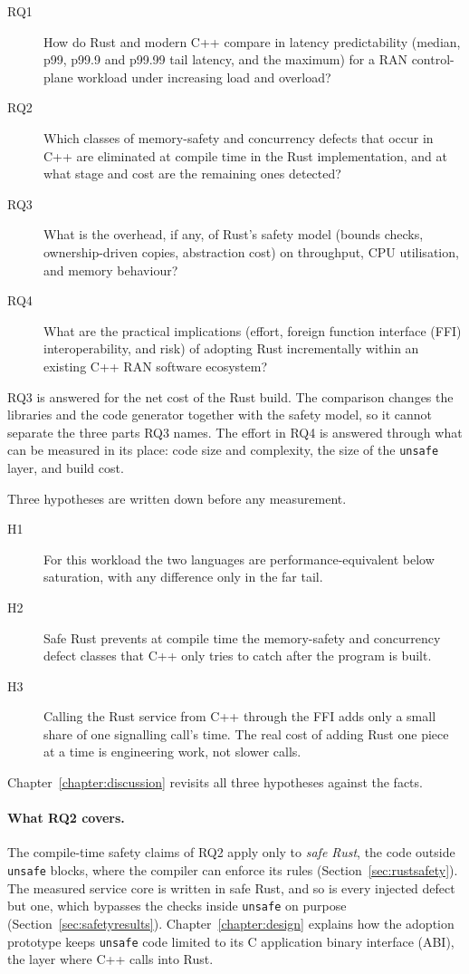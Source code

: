 \documentclass[english,oneside,a4paper,censored,csm,software-track-2020]{HYthesisML}
\begin{document}
\begin{description}
  \item[RQ1] How do Rust and modern C++ compare in latency predictability (median, p99,
        p99.9 and p99.99 tail latency, and the maximum) for a RAN control-plane workload
        under increasing load and overload?
  \item[RQ2] Which classes of memory-safety and concurrency defects that occur in C++ are
        eliminated at compile time in the Rust implementation, and at what stage and cost
        are the remaining ones detected?
  \item[RQ3] What is the overhead, if any, of Rust's safety model (bounds checks,
        ownership-driven copies, abstraction cost) on throughput, CPU utilisation, and
        memory behaviour?
  \item[RQ4] What are the practical implications (effort, foreign function interface (FFI)
        interoperability, and risk) of adopting Rust incrementally within an existing C++ RAN
        software ecosystem?
\end{description}
RQ3 is answered for the net cost of the Rust build. The comparison changes the libraries
and the code generator together with the safety model, so it
cannot separate the three parts RQ3 names. The effort in RQ4 is answered through what can be
measured in its place: code size and complexity, the size of the \texttt{unsafe} layer, and
build cost.

Three hypotheses are written down before any measurement.
\begin{description}
  \item[H1] For this workload the two languages are performance-equivalent below
        saturation, with any difference only in the far tail.
  \item[H2] Safe Rust prevents at compile time the memory-safety and concurrency defect
        classes that C++ only tries to catch after the program is built.
  \item[H3] Calling the Rust service from C++ through the FFI adds only a small
        share of one signalling call's time. The real cost of adding Rust one
        piece at a time is engineering work, not slower calls.
\end{description}
Chapter~\ref{chapter:discussion} revisits all three hypotheses against the facts.

\paragraph{What RQ2 covers.}
The compile-time safety claims of RQ2 apply only to \emph{safe Rust}, the code outside
\texttt{unsafe} blocks, where the compiler can enforce its rules
(Section~\ref{sec:rustsafety}). The measured service core is written in safe Rust, and so
is every injected defect but one, which bypasses the checks inside \texttt{unsafe} on
purpose (Section~\ref{sec:safetyresults}). Chapter~\ref{chapter:design} explains how the
adoption prototype keeps \texttt{unsafe} code limited to its C application binary
interface (ABI), the layer where C++ calls into Rust.
\end{document}

